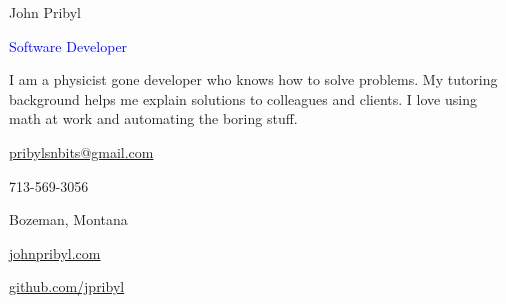 \documentclass[12pt]{resume}
\begin{document}
    \noindent\begin{minipage}[t]{0.63\textwidth}
        \vspace{-5mm}
        {\par \huge John Pribyl}
        {\par \large \textcolor{blue}{Software Developer}}
        \vspace{4pt}
        {\par I am a physicist gone developer who knows how to solve problems.
        My tutoring background helps me explain solutions to colleagues and
        clients. I love using math at work and automating the boring stuff.}
    \end{minipage}
    \begin{minipage}[t]{0.35\textwidth}
        \begin{flushright}
            {\par \textcolor{black}{\href{mailto:pribylsnbits@gmail.com}{pribylsnbits@gmail.com}}}
            {\par 713-569-3056}
            {\par Bozeman, Montana}
            {\par \textcolor{lavender}{\underline{\href{https://www.johnpribyl.com}{johnpribyl.com}}}}
            {\par \textcolor{lavender}{\underline{\href{https://www.github.com/jpribyl}{github.com/jpribyl}}}}
        \end{flushright}
    \end{minipage}
    \begin{minipage}[t]{0.03\textwidth}
        \begin{center}
            {\par \textcolor{black}\faEnvelope} 
            {\par \faMobile} 
            {\par \faMapMarker} 
            {\par \textcolor{lavender}\faGlobe} 
            {\par \textcolor{lavender}\faGithub} 
        \end{center}
        \vspace{.01mm}
    \end{minipage}
    \vspace{-3mm}
    \makebox[\linewidth]{\rule{\paperwidth}{0.2pt}}
\end{document}
